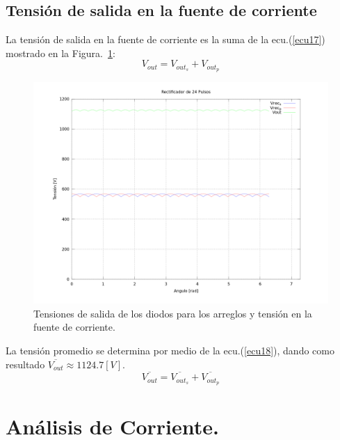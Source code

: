 \documentclass[12pt,graphicx,caption,rotating]{article}
\begin{document}
\subsection{Tensión de salida en la fuente de corriente}
\noindent
La tensión de salida en la fuente de corriente es la suma de la ecu.(\ref{ecu17}) mostrado en la Figura.~\ref{fig5}:
\begin{equation}
 V_{out} = V_{out_s} + V_{out_p}
 \label{ecu17}
\end{equation}
\begin{figure}[H]
	\centering
		\includegraphics[scale=0.3]{ten_rec.png}
	\caption{Tensiones de salida de los diodos para los arreglos y tensión en la fuente de corriente.}
	\label{fig5}
\end{figure}
\noindent
La tensión promedio se determina por medio de la ecu.(\ref{ecu18}), dando como resultado $\overline {{V_{out}}} \approx 1124.7 [V]$.
\begin{equation}
 \overline {{V_{out}}}  = \overline {{V_{ou{t_s}}}}  + \overline {{V_{ou{t_p}}}}
 \label{ecu18}
\end{equation}

\section{Análisis de Corriente.}
\end{document}

